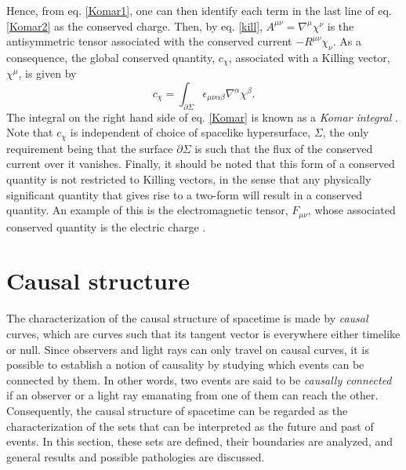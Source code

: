 \documentclass[
12pt,		%
openright,	%
twoside,  %
a4paper,			%
chapter=TITLE,		%
english,			%
french,				%
spanish,			%
brazil				%
]{USPSC-classe/USPSC}
\begin{document}
Hence, from eq. \ref{Komar1}, one can then identify each term in the last line of eq. \ref{Komar2} as the conserved charge. Then, by eq. \ref{kill}, $A^{\mu\nu}=\nabla^{\mu}\chi^{\nu}$ is the antisymmetric tensor associated with the conserved current $-R^{\mu\nu}\chi_{\nu}$. As a consequence, the global conserved quantity, $c_{\chi}$, associated with a Killing vector, $\chi^{\mu}$, is given by
\begin{equation}\label{Komar}
    c_{\chi}=\int_{\partial\Sigma}\epsilon_{\mu\nu\alpha\beta}\nabla^{\alpha}\chi^{\beta}.
\end{equation}
The integral on the right hand side of eq. \ref{Komar} is known as a \textit{Komar integral} \cite{Komar1959,Komar1963}. Note that $c_{\chi}$ is independent of choice of spacelike hypersurface, $\Sigma$, the only requirement being that the surface $\partial\Sigma$ is such that the flux of the conserved current over it vanishes. Finally, it should be noted that this form of a conserved quantity is not restricted to Killing vectors, in the sense that any physically significant quantity that gives rise to a two-form will result in a conserved quantity. An example of this is the electromagnetic tensor, $F_{\mu\nu}$, whose associated conserved quantity is the electric charge \cite{Wald1984}.

\section{Causal structure}\label{causal}

The characterization of the causal structure of spacetime is made by \textit{causal} curves, which are curves such that its tangent vector is everywhere either timelike or null. Since observers and light rays can only travel on causal curves, it is possible to establish a notion of causality by studying which events can be connected by them. In other words, two events are said to be \textit{causally connected} if an observer or a light ray emanating from one of them can reach the other. Consequently, the causal structure of spacetime can be regarded as the characterization of the sets that can be interpreted as the future and past of events. In this section, these sets are defined, their boundaries are analyzed, and general results and possible pathologies are discussed.
\end{document}
